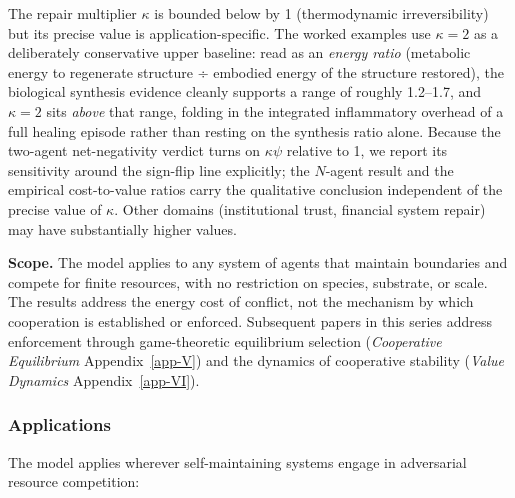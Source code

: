 \documentclass[11pt]{article}
\theoremstyle{plain}
\theoremstyle{definition}
\theoremstyle{remark}
\let\origsubsubsection\subsubsection
\renewcommand{\subsubsection}{\needspace{4\baselineskip}\origsubsubsection}
\begin{document}
The repair multiplier \(\kappa\) is bounded below by 1 (thermodynamic
irreversibility) but its precise value is application-specific. The
worked examples use \(\kappa = 2\) as a deliberately conservative upper
baseline: read as an \emph{energy ratio} (metabolic energy to regenerate
structure ÷ embodied energy of the structure restored), the biological
synthesis evidence cleanly supports a range of roughly 1.2--1.7, and
\(\kappa = 2\) sits \emph{above} that range, folding in the integrated
inflammatory overhead of a full healing episode rather than resting on
the synthesis ratio alone. Because the two-agent net-negativity verdict
turns on \(\kappa\psi\) relative to 1, we report its sensitivity around
the sign-flip line explicitly; the \(N\)-agent result and the empirical
cost-to-value ratios carry the qualitative conclusion independent of the
precise value of \(\kappa\). Other domains (institutional trust,
financial system repair) may have substantially higher values.

\textbf{Scope.} The model applies to any system of agents that maintain
boundaries and compete for finite resources, with no restriction on
species, substrate, or scale. The results address the energy cost of
conflict, not the mechanism by which cooperation is established or
enforced. Subsequent papers in this series address enforcement through
game-theoretic equilibrium selection (\emph{Cooperative Equilibrium}
Appendix~\ref{app-V}) and the dynamics of cooperative stability
(\emph{Value Dynamics} Appendix~\ref{app-VI}).

\subsubsection{Applications}\label{applications-3}

The model applies wherever self-maintaining systems engage in
adversarial resource competition:
\end{document}
